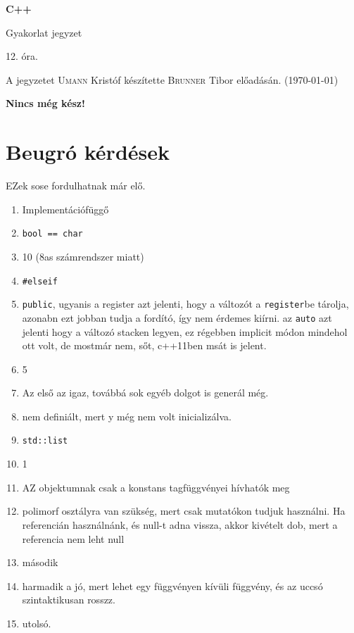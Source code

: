 \documentclass[a4paper,11.5pt,table]{article}
\begin{document}
	\setlength\parindent{0pt}
	\def\<{<\hspace{0mm}<}
	
	\theoremstyle{definition}
	\newtheorem{note}{Megjegyzés}[subsection]
	
	\begin{center}
		{\LARGE\textbf{C++}}
		
		{\Large Gyakorlat jegyzet}
		
		12. óra.
	\end{center}
	A jegyzetet \textsc{Umann} Kristóf készítette \textsc{Brunner} Tibor  előadásán. (\today)
	\medskip
	
	
	{\LARGE \textbf{Nincs még kész!}}
	\section{Beugró kérdések}
	EZek sose fordulhatnak már elő.
	\begin{enumerate}
		\item Implementációfüggő
		\item \texttt{bool == char}
		\item 10 (8as számrendszer miatt)
		\item \texttt{\#elseif}
		\item \texttt{public}, ugyanis a register azt jelenti, hogy a változót a \texttt{register}be tárolja, azonabn ezt jobban tudja a fordító, így nem érdemes kiírni. az \texttt{auto} azt jelenti hogy a változó stacken legyen, ez régebben implicit módon mindehol ott volt, de mostmár nem, sőt, c++11ben msát is jelent.
		\item 5
		\item Az első az igaz, továbbá sok egyéb dolgot is generál még.
		\item nem definiált, mert y még nem volt inicializálva.
		\item \texttt{std::list}
		\item 1
		\item AZ objektumnak csak a konstans tagfüggvényei hívhatók meg
		\item polimorf osztályra van szükség, mert csak mutatókon tudjuk használni. Ha referencián használnánk, és null-t adna vissza, akkor kivételt dob, mert a referencia nem leht null
		\item második
		\item harmadik a jó, mert lehet egy függvényen kívüli függvény, és az uccsó szintaktikusan rosszz.
		\item utolsó.
	\end{enumerate}
\end{document}
